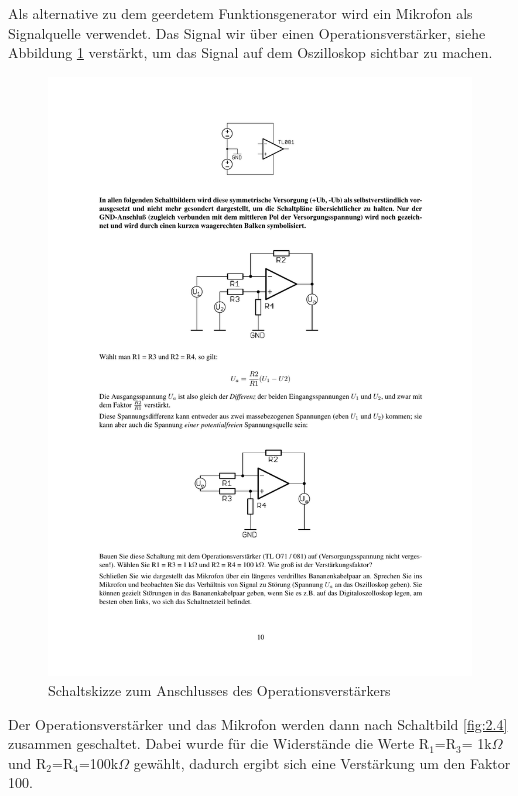 \documentclass[12pt,a4paper]{article}
\begin{document}
Als alternative zu dem geerdetem Funktionsgenerator wird ein Mikrofon als Signalquelle verwendet. Das Signal wir über einen Operationsverstärker, siehe Abbildung \ref{fig:2.33} verstärkt, um das Signal auf dem Oszilloskop sichtbar zu machen.

\begin{figure}[H] 
  \centering
    \includegraphics[trim = 10mm 240mm 10mm 15mm, clip, scale = 1]{Op-Amp.pdf}
  	\caption[Schaltskizze zum Anschlusses des Operationsverstärkers]{Schaltskizze zum Anschlusses des Operationsverstärkers\footnotemark}
  \label{fig:2.33}
\end{figure}

Der Operationsverstärker und das Mikrofon werden dann nach Schaltbild \ref{fig:2.4} zusammen geschaltet.
Dabei wurde für die Widerstände die Werte R$_1$=R$_3$= 1k$\Omega$ und R$_2$=R$_4$=100k$\Omega$ gewählt, dadurch ergibt sich eine Verstärkung um den Faktor 100.
\end{document}
